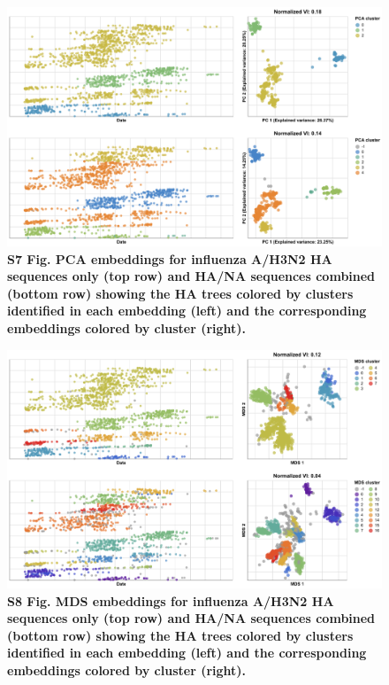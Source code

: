 \documentclass[10pt,letterpaper]{article}
\begin{document}
\begin{figure}[!h]
\includegraphics[width=\columnwidth]{figures/flu-2016-2018-ha-na-pca-by-cluster.png}
\caption*{{\bf S7 Fig. PCA embeddings for influenza A/H3N2 HA sequences only (top row) and HA/NA sequences combined (bottom row) showing the HA trees colored by clusters identified in each embedding (left) and the corresponding embeddings colored by cluster (right).}}
\end{figure}

\begin{figure}[!h]
\includegraphics[width=\columnwidth]{figures/flu-2016-2018-ha-na-mds-by-cluster.png}
\caption*{{\bf S8 Fig. MDS embeddings for influenza A/H3N2 HA sequences only (top row) and HA/NA sequences combined (bottom row) showing the HA trees colored by clusters identified in each embedding (left) and the corresponding embeddings colored by cluster (right).}}
\end{figure}
\end{document}

